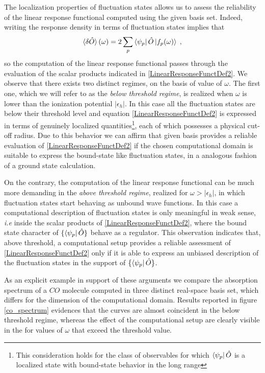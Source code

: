\documentclass[reprint,aps,prb]{revtex4-1}
\newcommand{\eps}{\epsilon}
\newcommand{\be}{\begin{equation}}
\newcommand{\ee}{\end{equation}}
\newcommand{\lb}{\label}
\newcommand{\op}[1]{\hat {#1}}
\begin{document}
The localization properties of fluctuation states allows us to assess the reliability of the linear response functional computed using the given basis set. Indeed, writing the response 
density in terms of fluctuation states implies that 
\be\lb{LinearResponseFunctDef2}
\braket{\delta\op O}(\omega) = 2\sum_p \bra{\psi_p}\op O\ket{f_p(\omega)} \;,
\ee
so the computation of the linear response functional passes through the evaluation of the scalar products indicated in \eqref{LinearResponseFunctDef2}. 
We observe that there exists two distinct regimes, on the basis of value of $\omega$. The first one, which we will refer to as the \emph{below threshold regime}, is realized when $\omega$ 
is lower than the ionization potential $|\eps_h|$. In this case all the fluctuation states are below their threshold level and equation \eqref{LinearResponseFunctDef2} is expressed in terms 
of genuinely localized quantities\footnote{This consideration holds for the class of observables for which $\bra{\psi_p}\op O$ is a localized state  with bound-state behavior in the long 
range}, each of which possesses a physical cut-off radius.
Due to this behavior we can affirm that given basis provides a reliable evaluation of \eqref{LinearResponseFunctDef2} if the chosen computational domain is suitable to express the
bound-state like fluctuation states, in a analogous fashion of a ground state calculation. 

On the contrary, the computation of the linear response functional can be much more demanding in the \emph{above threshold regime}, realized for $\omega>|\eps_h|$, in which fluctuation 
states start behaving as unbound wave functions. In this case a computational description of fluctuation states is only meaningful in weak sense, \emph{i.e} inside the scalar products of 
\eqref{LinearResponseFunctDef2}, where the bound state character of $\{\bra{\psi_p}\op O\}$ behave as a regulator. This observation indicates that, above threshold, a computational setup 
provides a reliable assessment of \eqref{LinearResponseFunctDef2} only if it is able to express an unbiased description of the fluctuation states in the support of $\{\bra{\psi_p}\op O\}$. 

As an explicit example in support of these arguments we compare the absorption spectrum of a $CO$ molecule computed in three distinct real-space basis set, which differs for the dimension of 
the computational domain. Results reported in figure \ref{co_spectrum} evidences that the curves are almost coincident in the below threshold regime, whereas the effect of the computational 
setup are clearly visible in the for values of $\omega$ that exceed the threshold value. 
\end{document}

